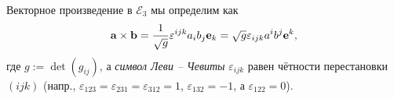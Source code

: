 Векторное произведение в $\mathcal{E}_3$ мы определим как
\[
  \mathbf{a} \times \mathbf{b} = \frac{1}{\sqrt{g}} \varepsilon^{ijk} a_i b_j \mathbf{e}_k
  = \sqrt{g} \varepsilon_{ijk} a^i b^j \skew{-7}\mathbf{e}^k,
\]
где $ g := \det (g_{ij}) $, а \emph{символ Леви -- Чевиты} $ \varepsilon_{ijk} $
равен чётности перестановки $ (ijk) $ (напр., $ \varepsilon_{123} =
\varepsilon_{231} = \varepsilon_{312} = 1 $, $
\varepsilon_{132} = -1 $, а $ \varepsilon_{122} = 0 $).
